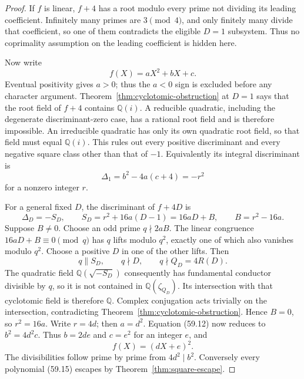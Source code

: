 \documentclass[10pt,reqno]{amsart}
\theoremstyle{definition}
\newcommand{\1}{\mathbf 1}
\begin{document}
\begin{proof}
If $f$ is linear, $f+4$ has a root modulo every prime not dividing its
leading coefficient.  Infinitely many primes are $3\pmod4$, and only
finitely many divide that coefficient, so one of them contradicts the
eligible $D=1$ subsystem.  Thus no coprimality assumption on the leading
coefficient is hidden here.

Now write
\begin{equation}\tag{59.11}
                         f(X)=aX^2+bX+c.
\end{equation}
Eventual positivity gives $a>0$; thus the $a<0$ sign is excluded before any
character argument.  Theorem~\ref{thm:cyclotomic-obstruction} at $D=1$ says
that the root field of $f+4$ contains $\mathbb Q(i)$.  A reducible
quadratic, including the degenerate discriminant-zero case, has a rational
root field and is therefore impossible.  An irreducible quadratic has only
its own quadratic root field, so that field must equal $\mathbb Q(i)$.
This rules out every positive discriminant and every negative square class
other than that of $-1$.  Equivalently its integral discriminant is
\begin{equation}\tag{59.12}
              \Delta_1=b^2-4a(c+4)=-r^2
\end{equation}
for a nonzero integer $r$.

For a general fixed $D$, the discriminant of $f+4D$ is
\begin{equation}\tag{59.13}
 \Delta_D=-S_D,
 \qquad S_D=r^2+16a(D-1)=16aD+B,
 \qquad B=r^2-16a.
\end{equation}
Suppose $B\ne0$.  Choose an odd prime $q\nmid2aB$.  The linear congruence
$16aD+B\equiv0\pmod q$ has $q$ lifts modulo $q^2$, exactly one of which
also vanishes modulo $q^2$.  Choose a positive $D$ in one of the other
lifts.  Then
\begin{equation}\tag{59.14}
                q\parallel S_D,
                \qquad q\nmid D,
                \qquad q\nmid Q_D=4R(D).
\end{equation}
The quadratic field $\mathbb Q(\sqrt{-S_D})$ consequently has fundamental
conductor divisible by $q$, so it is not contained in
$\mathbb Q(\zeta_{Q_D})$.  Its intersection with that cyclotomic field is
therefore $\mathbb Q$.  Complex conjugation acts trivially on the
intersection, contradicting Theorem~\ref{thm:cyclotomic-obstruction}.
Hence $B=0$, so $r^2=16a$.  Write $r=4d$; then $a=d^2$.
Equation (59.12) now reduces to $b^2=4d^2c$.  Thus $b=2de$ and $c=e^2$
for an integer $e$, and
\begin{equation}\tag{59.15}
                         f(X)=(dX+e)^2.
\end{equation}
The divisibilities follow prime by prime from $4d^2\mid b^2$.  Conversely
every polynomial (59.15) escapes by Theorem~\ref{thm:square-escape}.
\end{proof}
\end{document}
